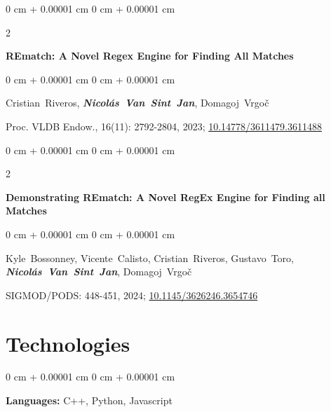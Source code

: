 \documentclass[10pt, letterpaper]{article}
\newenvironment{onecolentry}{
    \begin{adjustwidth}{
        0 cm + 0.00001 cm
    }{
        0 cm + 0.00001 cm
    }
}{
    \end{adjustwidth}
} %
\newenvironment{twocolentry}[2][]{
    \onecolentry
    \def\secondColumn{#2}
    \setcolumnwidth{\fill, 4.5 cm}
    \begin{paracol}{2}
}{
    \switchcolumn \raggedleft \secondColumn
    \end{paracol}
    \endonecolentry
} %
\begin{document}
        
        \begin{samepage}
            \begin{twocolentry}{
                2023
            }
                \textbf{REmatch: A Novel Regex Engine for Finding All Matches}
            \end{twocolentry}

            \vspace{0.10 cm}
            
            \begin{onecolentry}
                \mbox{Cristian Riveros}, \mbox{\textbf{\textit{Nicolás Van Sint Jan}}}, \mbox{Domagoj Vrgoč}

                \vspace{0.10 cm}

                Proc. VLDB Endow., 16(11): 2792-2804, 2023; \href{https://doi.org/10.14778/3611479.3611488}{10.14778/3611479.3611488}
        \end{onecolentry}

        \vspace{0.2 cm}

        \begin{twocolentry}{
            2024
        }
            \textbf{Demonstrating REmatch: A Novel RegEx Engine for Finding all Matches}
        \end{twocolentry}

        \vspace{0.10 cm}
        
        \begin{onecolentry}
            \mbox{Kyle Bossonney}, \mbox{Vicente Calisto}, \mbox{Cristian Riveros}, \mbox{Gustavo Toro}, \mbox{\textbf{\textit{Nicolás Van Sint Jan}}}, \mbox{Domagoj Vrgoč}

            \vspace{0.10 cm}

            SIGMOD/PODS: 448-451, 2024; \href{https://doi.org/10.1145/3626246.3654746}{10.1145/3626246.3654746}
        \end{onecolentry}
        
        \end{samepage}

    
    \section{Technologies}



        
        \begin{onecolentry}
            \textbf{Languages:} C++, Python, Javascript
        \end{onecolentry}
\end{document}
